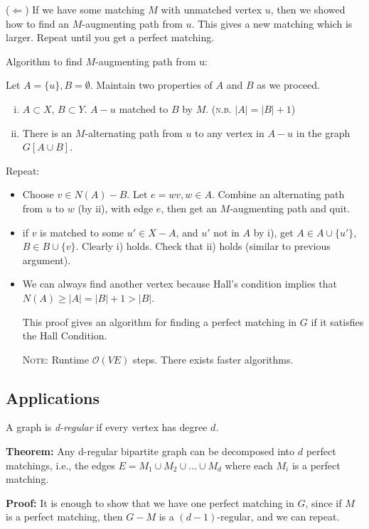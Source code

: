 \documentclass[11pt, letterpaper, oneside]{article}
\newcommand{\bigO}{\ensuremath{\mathcal{O}}}%
\begin{document}
($\Leftarrow$) If we have some matching $M$ with unmatched vertex $u$, then we showed how to find an $M$-augmenting path from $u$. This gives a new matching which is larger. Repeat until you get a perfect matching.

Algorithm to find $M$-augmenting path from u:

Let $A = \{u\}, B=\emptyset$. Maintain two properties of $A$ and $B$ as we proceed.

\begin{enumerate}[i)]
	\item $A \subset X$, $B \subset Y$. $A-u$ matched to $B$ by $M$. (\textsc{n.b.} $|A|=|B|+1$)
	\item There is an $M$-alternating path from $u$ to any vertex in $A-u$ in the graph $G[A \cup B]$. 
\end{enumerate}

Repeat:
\begin{itemize}
	\item Choose $v \in N(A)-B$. Let $e=wv, w \in A$. Combine an alternating path from $u$ to $w$ (by ii), with edge $e$, then get an $M$-augmenting path and quit.
	\item if $v$ is matched to some $u' \in X-A$, and $u'$ not in $A$ by i), get $A \in A \cup \{u'\}$, $B \in B \cup \{v\}$. Clearly i) holds. Check that ii) holds (similar to previous argument).
	\item We can always find another vertex because Hall's condition implies that $N(A) \geq |A| = |B| + 1 > |B|$.
	
This proof gives an algorithm for finding a perfect matching in $G$ if it satisfies the Hall Condition.

\textsc{Note:} Runtime $\bigO(VE)$ steps. There exists faster algorithms.
\end{itemize}

\subsection{Applications}

A graph is \textit{d-regular} if every vertex has degree $d$.

\textbf{Theorem:} Any d-regular bipartite graph can be decomposed into $d$ perfect matchings, i.e., the edges $E = M_1 \cup M_2 \cup ... \cup M_d$ where each $M_i$ is a perfect matching.

\textbf{Proof:} It is enough to show that we have one perfect matching in $G$, since if $M$ is a perfect matching, then $G-M$ is a $(d-1)$-regular, and we can repeat.
\end{document}
